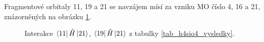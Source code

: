 \documentclass[
  digital, %
  table,   %
  lof,     %
  lot,     %
]{fithesis3}
\begin{document}
Fragmentové orbitaly  11, 19 a 21 se navzájem mísí za vzniku MO číslo 4, 16 a 21, znázorněných na obrázku \ref{obr_h4sio4_vysledky_II}.   
\begin{figure}
\begin{center}
\caption{Interakce $\bra{11}{\hat{H}}\ket{21}$, $\bra{19}{\hat{H}}\ket{21}$ z tabulky \ref{tab_h4sio4_vysledky}.}

\label{obr_h4sio4_vysledky_II}\end{center}
\end{figure}
\end{document}
